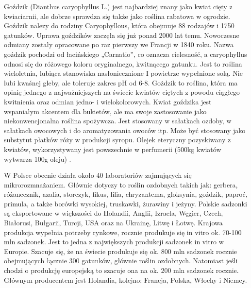\documentclass[two column, twoside, a4paper]{article}
\begin{document}
Goździk (Dianthus caryophyllus L.) jest najbardziej znany jako kwiat cięty
z kwiaciarnii, ale  dobrze sprawdza się także jako roślina rabatowa w ogrodzie. Goździk nalezy do rodziny Caryophyllous, która obejmuje  88 rodzajów i 1750 gatunków. Uprawa goździków zaczęła się już ponad 2000 lat temu. Nowoczesne odmiany zostały opracowane po raz pierwszy we Francji w 1840 roku. Nazwa goździk pochodzi od łacińskiego „Carnatio”, co oznacza cielesność, a caryophyllus odnosi się do różowego koloru oryginalnego, kwitnącego gatunku. Jest to roślina wieloletnia, lubiąca stanowiska nasłoniecznione I powietrze wypełnione solą. Nie lubi kwaśnej gleby, ale toleruje zakres pH od 6-8. Gożdzik to roślina, która ma opinię jednego z najważniejszych na świecie kwiatów ciętych z powodu ciągłego kwitnienia  oraz odmian jedno- i wielokolorowych.
Kwiat goździka jest wspaniałym akcentem dla bukietów, ale ma swoje zastosowanie  jako niekonwencjonalna roślina spożywcza. Jest stosowany w sałatkach ozdoby,
w sałatkach owocowych i do aromatyzowania owoców itp. Może być stosowany jako substytut płatków róży w produkcji syropu. Olejek eteryczny pozyskiwany  z kwiatów, wykorzystywany jest powszechnie w perfumerii (500kg kwiatów wytwarza 100g oleju) .

W Polsce obecnie działa około 40 laboratoriów zajmujących się mikrorozmnażaniem. Głównie dotyczy to roślin ozdobnych takich jak: gerbera, różanecznik, azalia, storczyk, fikus, lilia, chryzantema, gloksynia, goździk, paproć, primula, a także borówki wysokiej, truskawki, żurawiny i jeżyny. Polskie sadzonki są eksportowane w większości do Holandii, Anglii, Izraela, Węgier, Czech, Białorusi, Bułgarii, Turcji, USA oraz na Ukrainę, Litwę i Łotwę. Krajowa produkcja wypełnia potrzeby rynkowe, rocznie produkuje się in vitro ok. 70-100 mln sadzonek. Jest to jedna z największych produkcji sadzonek in vitro w Europie. Szacuje się, że na świecie produkuje się ok. 800 mln sadzonek rocznie obejmujących łącznie 300 gatunków, głównie roślin ozdobnych. Natomiast jeśli chodzi o produkcję europejską to szacuje ona na ok. 200 mln sadzonek rocznie. Głównym producentem jest Holandia, kolejno: Francja, Polska, Włochy i Niemcy.
\end{document}
